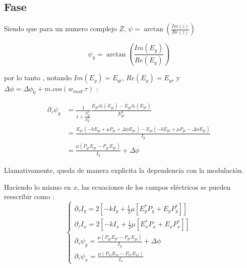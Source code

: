 		\subsection{Fase}
			
			Siendo que para un numero complejo $Z$, $\psi=\arctan(\frac{Im(z)}{Re(z)})$
			
			\[  \psi_y= \arctan(\frac{Im(E_y)}{Re(E_y)}) \]
			
			por  lo tanto , notando $Im(E_y)=E_{yi}$, $Re(E_y)=E_{yr}$ y $\Delta \phi=\Delta \phi_0 + m.cos(w_{mod}.\tau) $ :
			
			\begin{align}
			\partial_{\tau}\psi_y  &= \frac{1}{ 1+\frac{ E^2_{yi} }{ E^2_{yr} } }\frac{ E_{yr} \partial_{\tau}( E_{yi} ) - E_{yi} \partial_{\tau}( E_{yr} ) }{ E^2_{yr} } \\ 
			&= \frac{ E_{yr} ( -kE_{yi}+\mu P_{yi}+\Delta \phi E_{yr} ) -  E_{yi} ( -kE_{yr}+\mu P_{yr}-\Delta \phi E_{yi} ) }{ I_y } \\
			&= \frac{ \mu ( P_{yi} E_{yr} - P_{yr} E_{yi} ) }{ I_y } + \Delta \phi	
			\end{align}
			
			Llamativamente, queda de manera explicita la dependencia con la modulación.
			
			Haciendo lo mismo en $x$, las ecuaciones de los campos eléctricos se pueden reescribir como :
			\begin{equation}
			\begin{cases}
			\partial_{\tau}I_y=2[-k I_y +\tfrac{1}{2}\mu[E^*_yP_y+E_yP^*_y]   ] \\
			\partial_{\tau}I_x=2[-k I_x +\tfrac{1}{2}\mu[E^*_xP_x+E_xP^*_x]   ]	\\	
			\partial_{\tau}\psi_y  = \frac{ \mu ( P_{yi} E_{yr} - P_{yr} E_{yi} ) }{ I_y } + \Delta \phi \\
			\partial_{\tau}\psi_x  = \frac{\mu(P_{xi}E_{xr}-P_{xr}E_{xi})}{I_x}
			\end{cases}
			\label{eq: int y fases}
			\end{equation}
			
			
			
